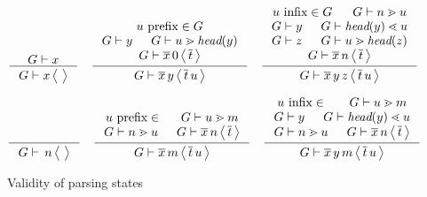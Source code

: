 \documentclass{article}
\begin{document}
\begin{figure}

\[
\inference{\stree{G}{x}}{\sstate{G}{x}{}}
\quad
\inference{
  \hasfix{u}{\prefix{}{}}{G} \\
  \stree{G}{y} & \sgd{G}{u}{\head{y}} \\
  \sqstate{G}{\seq{x}}{0}{\seq{t}}}
  {\sstate{G}{\seq{x}\,y}{\seq{t}\,u}}
\quad
\inference{
  \hasfix{u}{\infix{}{}}{G} & \sgd{G}{n}{u} \\
  \stree{G}{y} & \sld{G}{\head{y}}{u} \\
  \stree{G}{z} & \sgd{G}{u}{\head{z}} \\
  \sqstate{G}{\seq{x}}{n}{\seq{t}}}
  {\sstate{G}{\seq{x}\,y\,z}{\seq{t}\,u}}
\]

\[
\inference{}{\sqstate{G}{}{n}{}}
\quad
\inference{
  \hasfix{u}{\prefix{}{}} & \sgd{G}{u}{m} \\
  \sgd{G}{n}{u} & \sqstate{G}{\seq{x}}{n}{\seq{t}}}
  {\sqstate{G}{\seq{x}}{m}{\seq{t}\,u}}
\quad
\inference{
  \hasfix{u}{\infix{}{}} & \sgd{G}{u}{m} \\
  \stree{G}{y} & \sld{G}{\head{y}}{u} \\
  \sgd{G}{n}{u} & \sqstate{G}{\seq{x}}{n}{\seq{t}}}
  {\sqstate{G}{\seq{x}\,y}{m}{\seq{t}\,u}}
\]

\caption{Validity of parsing states}
\end{figure}
\end{document}
